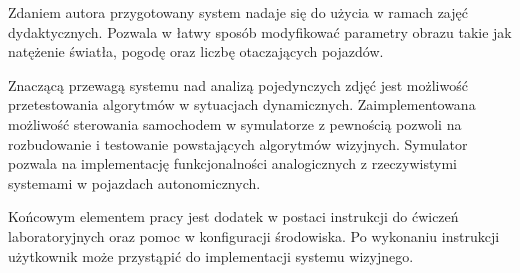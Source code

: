 Zdaniem autora przygotowany system nadaje się do użycia w ramach zajęć dydaktycznych.
Pozwala w łatwy sposób modyfikować parametry obrazu takie jak natężenie światła, pogodę oraz liczbę otaczających pojazdów. 

Znaczącą przewagą systemu nad analizą pojedynczych zdjęć jest możliwość przetestowania algorytmów w sytuacjach dynamicznych. 
Zaimplementowana możliwość sterowania samochodem w symulatorze z pewnością pozwoli na rozbudowanie i testowanie powstających algorytmów wizyjnych. Symulator pozwala na implementację funkcjonalności analogicznych z rzeczywistymi systemami w pojazdach autonomicznych.

Końcowym elementem pracy jest dodatek w postaci instrukcji do ćwiczeń laboratoryjnych oraz pomoc w konfiguracji środowiska. Po wykonaniu instrukcji użytkownik może przystąpić do implementacji systemu wizyjnego.

